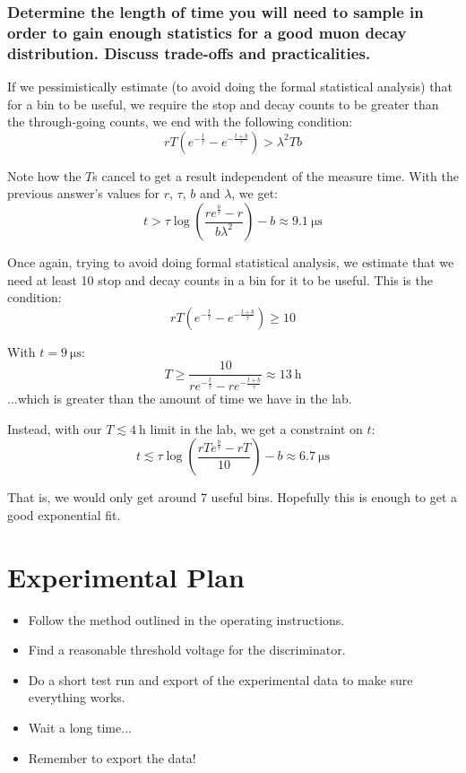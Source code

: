 \documentclass[a4paper]{scrartcl}
\begin{document}
\subsubsection{Determine the length of time you will need to sample in order to gain enough statistics for a good muon decay distribution. Discuss trade-offs and practicalities.}
If we pessimistically estimate (to avoid doing the formal statistical analysis) that for a bin to be useful, we require the stop and decay counts to be greater than the through-going counts, we end with the following condition:
\[r T \left(e^{-\frac{t}{\tau}} - e^{-\frac{t + b}{\tau}}\right) > \lambda^2 T b\]

Note how the \(T\)s cancel to get a result independent of the measure time. With the previous answer's values for \(r\), \(\tau\), \(b\) and \(\lambda\), we get:
\[t > \tau \log \left(\frac{r e^{\frac{b}{\tau}} - r}{b \lambda^2}\right) - b \approx \SI{9.1}{\micro\second}\]

Once again, trying to avoid doing formal statistical analysis, we estimate that we need at least 10 stop and decay counts in a bin for it to be useful. This is the condition:
\[r T \left(e^{-\frac{t}{\tau}} - e^{-\frac{t + b}{\tau}}\right) \geq 10\]

With \(t = \SI{9}{\micro\second}\):
\[T \geq \frac{10}{r e^{-\frac{t}{\tau}} - r e^{-\frac{t + b}{\tau}}} \approx \SI{13}{\hour}\]
...which is greater than the amount of time we have in the lab.

Instead, with our \(T \lesssim \SI{4}{\hour}\) limit in the lab, we get a constraint on \(t\):
\[t \lesssim \tau \log \left(\frac{r T e^{\frac{b}{\tau}} - r T}{10}\right) - b \approx \SI{6.7}{\micro\second}\]

That is, we would only get around 7 useful bins. Hopefully this is enough to get a good exponential fit.

\section{Experimental Plan}
\begin{itemize}
    \item Follow the method outlined in the operating instructions.
    \item Find a reasonable threshold voltage for the discriminator.
    \item Do a short test run and export of the experimental data to make sure everything works.
    \item Wait a long time...
    \item Remember to export the data!
\end{itemize}
\end{document}
